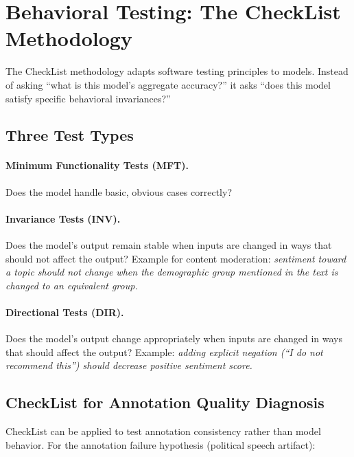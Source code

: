 \section{Behavioral Testing: The CheckList Methodology}

The CheckList methodology \autocite{ribeiro2020checklist} adapts software testing principles to \ml models. Instead of asking ``what is this model's aggregate accuracy?'' it asks ``does this model satisfy specific behavioral invariances?''

\subsection{Three Test Types}

\paragraph{Minimum Functionality Tests (MFT).} Does the model handle basic, obvious cases correctly?

\paragraph{Invariance Tests (INV).} Does the model's output remain stable when inputs are changed in ways that should not affect the output? Example for content moderation: \textit{sentiment toward a topic should not change when the demographic group mentioned in the text is changed to an equivalent group.}

\paragraph{Directional Tests (DIR).} Does the model's output change appropriately when inputs are changed in ways that should affect the output? Example: \textit{adding explicit negation (``I do not recommend this'') should decrease positive sentiment score.}

\subsection{CheckList for Annotation Quality Diagnosis}

CheckList can be applied to test annotation consistency rather than model behavior. For the annotation failure hypothesis (political speech artifact):

